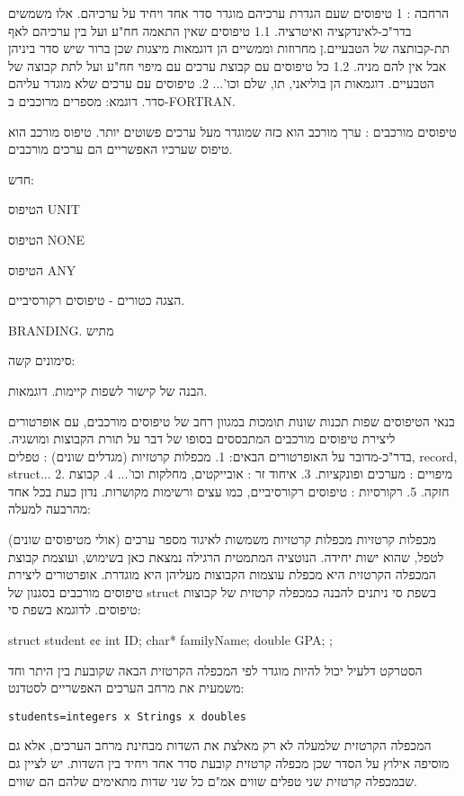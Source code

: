       הרחבה :
      1 טיפוסים שעם הגדרת ערכיהם מוגדר סדר אחד ויחיד על ערכיהם. אלו משמשים בדר"כ-לאינדקציה ואיטרציה.
      1.1 טיפוסים שאין התאמה חח"ע ועל בין ערכיהם לאף תת-קבותצה של הטבעיים.ן מחרוזות וממשיים הן דוגמאות מיצגות שכן ברור שיש סדר ביניהן אבל אין להם מניה.
      1.2 כל טיפוסים עם קבוצת ערכים עם מיפוי חח"ע ועל לתת קבוצה של הטבעיים. דוגמאות הן בוליאני, תו, שלם וכו'...
      2. טיפוסים עם ערכים שלא מוגדר עליהם סדר. דוגמא: מספרים מרוכבים ב-FORTRAN.

      טיפוסים מורכבים :
      ערך מורכב הוא כזה שמוגדר מעל ערכים פשוטים יותר. טיפוס מורכב הוא טיפוס שערכיו האפשריים הם ערכים מורכבים.

      חדש:
      \begin{ציינון}
\item הטיפוס UNIT
\item הטיפוס NONE
\item הטיפוס ANY
\item הצגה כטורים - טיפוסים רקורסיביים.
\item BRANDING.
      מתיש
\item סימונים
      קשה:
\item הבנה של קישור לשפות קיימות. דוגמאות.
\item בנאי הטיפוסים
      שפות תכנות שונות תומכות במגוון רחב של טיפוסים מורכבים, עם אופרטורים ליצירת טיפוסים מורכבים המתבססים בסופו של דבר על תורת הקבוצות ומושגיה.
      בדר"כ-מדובר על האופרטורים הבאים:
      1. מכפלות קרטזיות (מגדלים שונים) : טפלים, record, struct...
      2. מיפויים : מערכים ופונקציות.
      3. איחוד זר : אובייקטים, מחלקות וכו'...
      4. קבוצת חזקה.
      5. רקורסיות : טיפוסים רקורסיביים, כמו עצים ורשימות מקושרות.
      נדון כעת בכל אחד מהרבעה למעלה:
  \end{ציינון}

      מכפלות קרטזיות
      מכפלות קרטזיות משמשות לאיגוד מספר ערכים (אולי מטיפוסים שונים) לטפל, שהוא ישות יחידה.
      הנוטציה המתמטית הרגילה נמצאת כאן בשימוש, ועוצמת קבוצת המכפלה הקרטזית היא מכפלת עוצמות הקבוצות מעליהן היא מוגדרת. אופרטורים ליצירת טיפוסים מורכבים בסגנון של struct בשפת סי ניתנים להבנה כמכפלה קרטזית של קבוצות טיפוסים. לדוגמא בשפת סי:

\begin{CPP}
struct student {¢¢
          int ID;
        char* familyName;
        double GPA;
};
\end{CPP}

      הסטרקט דלעיל יכול להיות מוגדר לפי המכפלה הקרטזית הבאה שקובעת בין היתר וחד משמעית את מרחב הערכים האפשריים לסטדנט:
\begin{verbatim}
students=integers x Strings x doubles
\end{verbatim}
      המכפלה הקרטזית שלמעלה לא רק מאלצת את השדות מבחינת מרחב הערכים, אלא גם מוסיפה אילוץ על הסדר שכן מכפלה קרטזית קובעת סדר אחד ויחיד בין השדות.
      יש לציין גם שבמכפלה קרטזית שני טפלים שווים אמ"ם כל שני שדות מתאימים שלהם הם שווים.

